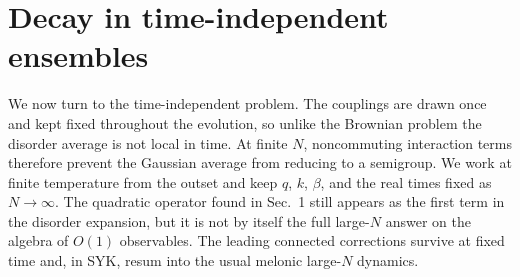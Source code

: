\documentclass{article}
\theoremstyle{definition}
\begin{document}
\section{Decay in time-independent ensembles}
\label{sec:quenched_general}

We now turn to the time-independent problem. The couplings are drawn once and kept fixed throughout the evolution, so unlike the Brownian problem the disorder average is not local in time. At finite $N$, noncommuting interaction terms therefore prevent the Gaussian average from reducing to a semigroup. We work at finite temperature from the outset and keep $q$, $k$, $\beta$, and the real times fixed as $N\to\infty$. The quadratic operator found in Sec.~1 still appears as the first term in the disorder expansion, but it is not by itself the full large-$N$ answer on the algebra of $O(1)$ observables. The leading connected corrections survive at fixed time and, in SYK, resum into the usual melonic large-$N$ dynamics.
\end{document}
